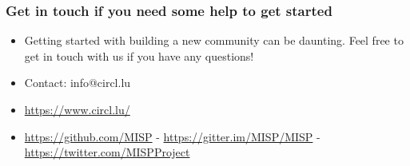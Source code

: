 \begin{frame}
\frametitle{Get in touch if you need some help to get started}
\begin{itemize}
\item Getting started with building a new community can be daunting. Feel free to get in touch with us if you have any questions!
\item Contact: info@circl.lu
\item \url{https://www.circl.lu/}
\item \url{https://github.com/MISP} - \url{https://gitter.im/MISP/MISP} - \url{https://twitter.com/MISPProject}
\end{itemize}
\end{frame}
